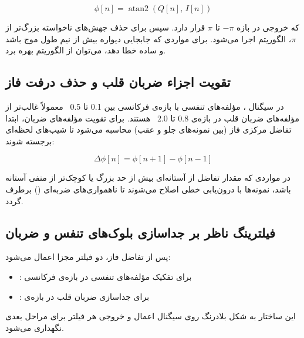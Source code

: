 \begin{equation}
\phi[n] = \operatorname{atan2}(Q[n],\, I[n])
\label{eq:phase_extraction}
\end{equation}

که خروجی در بازه $-\pi$ تا $\pi$ قرار دارد. سپس برای حذف جهش‌های ناخواسته بزرگ‌تر از $\pi$، الگوریتم  اجرا می‌شود. برای مواردی که جابجایی دیواره بیش از نیم طول موج باشد و  ساده خطا دهد، می‌توان از الگوریتم  بهره برد.

\subsection{تقویت اجزاء ضربان قلب و حذف درفت فاز}
\label{sec:phase-detrend}

در سیگنال ، مؤلفه‌های تنفسی با بازه‌ی فرکانسی بین 0.1 تا 0.5~ معمولاً غالب‌تر از مؤلفه‌های ضربان قلب در بازه‌ی 0.8 تا 2.0~ هستند. برای تقویت مؤلفه‌های ضربان، ابتدا تفاضل مرکزی فاز (بین نمونه‌های جلو و عقب) محاسبه می‌شود تا شیب‌های لحظه‌ای برجسته شوند:

\begin{equation}
\Delta \phi[n] = \phi[n+1] - \phi[n-1]
\label{eq:phase_diff}
\end{equation}

در مواردی که مقدار تفاضل از آستانه‌ای بیش از حد بزرگ یا کوچک‌تر از منفی آستانه باشد، نمونه‌ها با درون‌یابی خطی اصلاح می‌شوند تا ناهمواری‌های ضربه‌ای () برطرف گردد.

\subsection{فیلترینگ ناظر بر جداسازی بلوک‌های تنفس و ضربان}
\label{sec:bandpass-filtering}

پس از تفاضل فاز، دو فیلتر  مجزا اعمال می‌شود:

\begin{itemize}
  \item {}: برای تفکیک مؤلفه‌های تنفسی در بازه‌ی فرکانسی 
  \item {}: برای جداسازی ضربان قلب در بازه‌ی 
\end{itemize}

این ساختار به شکل بلادرنگ روی سیگنال اعمال و خروجی هر فیلتر برای مراحل بعدی نگهداری می‌شود.

